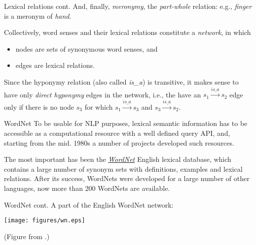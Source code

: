 \documentclass[style=upen, size=14pt]{powerdot}
\newcommand{\gold}{\color{arany}}
\theoremstyle{definition}
\begin{document}
\begin{slide}[toc=]{Lexical relations cont.}
  And, finally, \emph{\gold meronymy}, the \emph{part-whole} relation: e.g.,
  \emph{finger} is a meronym of \emph{hand}.\bigskip

  Collectively, word senses and their lexical relations constitute a \emph{\gold
    network}, in which
  \begin{itemize}
  \item nodes are sets of synonymous word senses, and
  \item edges are lexical relations. 
  \end{itemize}
  Since the hyponymy relation (also called \textit{is\_a}) is transitive, it
  makes sense to have only \emph{direct hyponymy} edges in the network, i.e.,
  the have an $s_1 \xrightarrow{is\_a} s_2$ edge only if there is no node $s_3$ for which
  $s_1 \xrightarrow{is\_a} s_3$ and $s_3 \xrightarrow{is\_a} s_2$.
\end{slide}

\begin{slide}[toc=WordNet]{WordNet}
  To be usable for NLP purposes, lexical semantic information has to be
  accessible as a computational resource with a well defined query API, and,
  starting from the mid. 1980s a number of projects developed such
  resources.\bigskip
  
  The most important has been the
  \href{https://wordnet.princeton.edu/}{\emph{WordNet}} English lexical
  database, which contains a large number of synonym sets with definitions,
  examples and lexical relations. After its success, WordNets were developed for
  a large number of other languages, now more than 200 WordNets are available.
\end{slide}

\begin{slide}[toc=]{WordNet cont.}
  A part of the English WordNet network:\medskip
  
  \begin{centering}
    
    \texttt{[image: figures/wn.eps]}


    \footnotesize{(Figure from \cite{navigli2009word}.)}
    
  \end{centering}
\end{slide}
\end{document}
